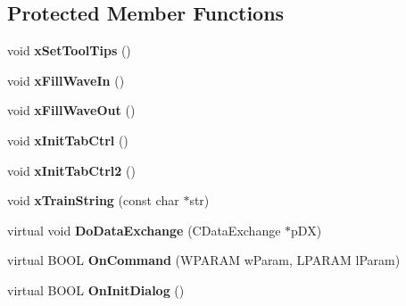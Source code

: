 \subsection*{Protected Member Functions}
\begin{DoxyCompactItemize}
\item 
\hypertarget{class_c_wavfrag_dlg_af9a312d00d6823dd02577630da15319a}{void {\bfseries x\-Set\-Tool\-Tips} ()}\label{class_c_wavfrag_dlg_af9a312d00d6823dd02577630da15319a}

\item 
\hypertarget{class_c_wavfrag_dlg_ab8317d37bb8bbe944508d4dc48a6f5d0}{void {\bfseries x\-Fill\-Wave\-In} ()}\label{class_c_wavfrag_dlg_ab8317d37bb8bbe944508d4dc48a6f5d0}

\item 
\hypertarget{class_c_wavfrag_dlg_a597e92839a4b33ed661ce26bf85c4604}{void {\bfseries x\-Fill\-Wave\-Out} ()}\label{class_c_wavfrag_dlg_a597e92839a4b33ed661ce26bf85c4604}

\item 
\hypertarget{class_c_wavfrag_dlg_a780dd2c6736f6b9b5b7e337395d5e2f6}{void {\bfseries x\-Init\-Tab\-Ctrl} ()}\label{class_c_wavfrag_dlg_a780dd2c6736f6b9b5b7e337395d5e2f6}

\item 
\hypertarget{class_c_wavfrag_dlg_ac1bd4d548188f91668936c96a4ae8e42}{void {\bfseries x\-Init\-Tab\-Ctrl2} ()}\label{class_c_wavfrag_dlg_ac1bd4d548188f91668936c96a4ae8e42}

\item 
\hypertarget{class_c_wavfrag_dlg_a193677401cb33613c486859555222512}{void {\bfseries x\-Train\-String} (const char $\ast$str)}\label{class_c_wavfrag_dlg_a193677401cb33613c486859555222512}

\item 
\hypertarget{class_c_wavfrag_dlg_a9a87a288a0932a94a856e8ba5e29db44}{virtual void {\bfseries Do\-Data\-Exchange} (C\-Data\-Exchange $\ast$p\-D\-X)}\label{class_c_wavfrag_dlg_a9a87a288a0932a94a856e8ba5e29db44}

\item 
\hypertarget{class_c_wavfrag_dlg_a6063ad1b626c1c60ca3eb0514608b1cc}{virtual B\-O\-O\-L {\bfseries On\-Command} (W\-P\-A\-R\-A\-M w\-Param, L\-P\-A\-R\-A\-M l\-Param)}\label{class_c_wavfrag_dlg_a6063ad1b626c1c60ca3eb0514608b1cc}

\item 
\hypertarget{class_c_wavfrag_dlg_af61341a18cb489f0f8ccb2e1fac0d711}{virtual B\-O\-O\-L {\bfseries On\-Init\-Dialog} ()}\label{class_c_wavfrag_dlg_af61341a18cb489f0f8ccb2e1fac0d711}


\end{DoxyCompactItemize}
